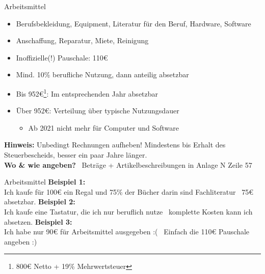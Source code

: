\documentclass{beamer}
\begin{document}
			\begin{frame}{Arbeitsmittel}
				\begin{itemize}
					\item Berufsbekleidung, Equipment, Literatur für den Beruf, Hardware, Software
					\item Anschaffung, Reparatur, Miete, Reinigung
					\item Inoffizielle(!) Pauschale: 110€
					\item Mind. 10\% berufliche Nutzung, dann anteilig absetzbar
					\item Bis 952€\footnote{800€ Netto + 19\% Mehrwertsteuer}: Im entsprechenden Jahr absetzbar
					\item Über 952€: Verteilung über typische Nutzungsdauer
					\begin{itemize}
						\item Ab 2021 nicht mehr für Computer und Software
					\end{itemize}
				\end{itemize}\pause
				\textbf{Hinweis:} Unbedingt Rechnungen aufheben! Mindestens bis Erhalt des Steuerbescheids, besser ein paar Jahre länger.\\\pause
				\textbf{Wo \& wie angeben?} \textrightarrow\ Beträge + Artikelbeschreibungen in Anlage N Zeile 57
			\end{frame}
		
			\begin{frame}{Arbeitsmittel}
				\textbf{Beispiel 1:}\\
				Ich kaufe für 100€ ein Regal und 75\% der Bücher darin sind Fachliteratur \textrightarrow\ 75€ absetzbar.\n\pause
				\textbf{Beispiel 2:}\\
				Ich kaufe eine Tastatur, die ich nur beruflich nutze \textrightarrow\ komplette Kosten kann ich absetzen.\n\pause
				\textbf{Beispiel 3:}\\
				Ich habe nur 90€ für Arbeitsmittel ausgegeben :( \textrightarrow\ Einfach die 110€ Pauschale angeben :)
			\end{frame}
			
\end{document}
